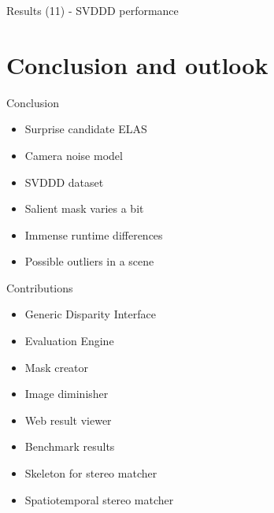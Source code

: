 \documentclass[10pt]{beamer}
\begin{document}
\begin{frame}[fragile]{Results (11) - SVDDD performance}
  \begin{table}
  \centering
  \caption{Result table for general performance of SVDDD (PBMP$_{noc,1px}$)}
  \end{table}
\end{frame}

\section{Conclusion and outlook}

\begin{frame}[fragile]{Conclusion}
  \begin{itemize}
    \item Surprise candidate ELAS
    \item Camera noise model
    \item SVDDD dataset
    \item Salient mask varies a bit
    \item Immense runtime differences
    \item Possible outliers in a scene
  \end{itemize}
\end{frame}

\begin{frame}[fragile]{Contributions}
  \begin{itemize}
    \item Generic Disparity Interface
    \item Evaluation Engine
    \item Mask creator
    \item Image diminisher
    \item Web result viewer
    \item Benchmark results
    \item Skeleton for stereo matcher
    \item Spatiotemporal stereo matcher
  \end{itemize}
\end{frame}
\end{document}
